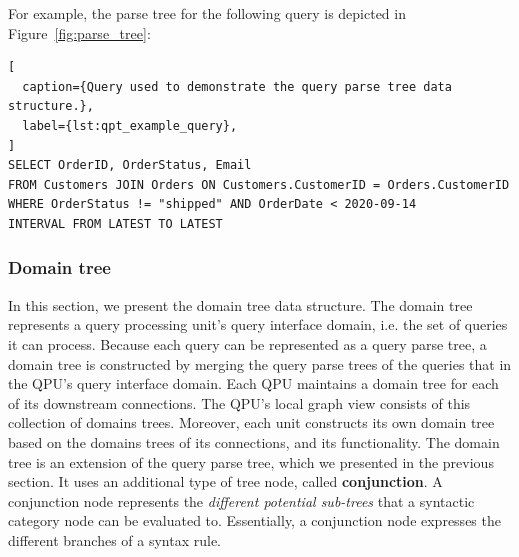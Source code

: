For example, the parse tree for the following query is depicted in Figure~\ref{fig:parse_tree}:
\begin{lstlisting}[
  caption={Query used to demonstrate the query parse tree data structure.},
  label={lst:qpt_example_query},
]
SELECT OrderID, OrderStatus, Email
FROM Customers JOIN Orders ON Customers.CustomerID = Orders.CustomerID
WHERE OrderStatus != "shipped" AND OrderDate < 2020-09-14
INTERVAL FROM LATEST TO LATEST
\end{lstlisting}

\subsubsection{Domain tree}
\label{sec:qpc_tree}

In this section, we present the domain tree data structure.
The domain tree represents a query processing unit's query interface domain,
i.e. the set of queries it can process.
Because each query can be represented as a query parse tree,
a domain tree is constructed by merging the query parse trees of the queries that in the QPU's query interface domain.
Each QPU maintains a domain tree for each of its downstream connections.
The QPU's local graph view consists of this collection of domains trees.
Moreover, each unit constructs its own domain tree based on the domains trees of its connections,
and its functionality.
The domain tree is an extension of the query parse tree, which we presented in the previous section.
It uses an additional type of tree node, called \textbf{conjunction}.
A conjunction node represents the \textit{different potential sub-trees} that a syntactic category node
can be evaluated to.
Essentially, a conjunction node expresses the different branches of a syntax rule.

